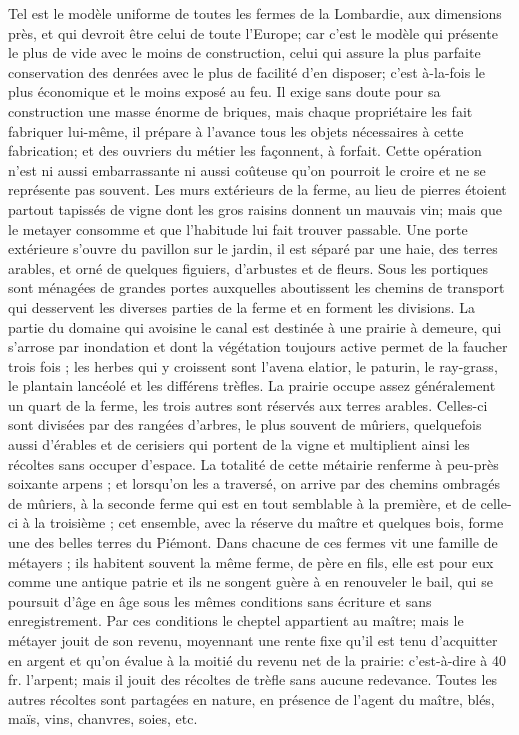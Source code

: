 \setcounter{page}{398}Tel est le modèle uniforme de toutes les fermes de la Lombardie, aux dimensions près, et qui devroit être celui de toute l'Europe; car c'est le modèle qui présente le plus de vide avec le moins de construction, celui qui assure la plus parfaite conservation des denrées avec le plus de facilité d'en disposer; c'est à-la-fois le plus économique et le moins exposé au feu. Il exige sans doute pour sa construction une masse énorme de briques, mais chaque propriétaire les fait fabriquer lui-même, il prépare à l'avance tous les objets nécessaires à cette fabrication; et des ouvriers du métier les façonnent, à forfait. Cette opération n'est ni aussi embarrassante ni aussi coûteuse qu'on pourroit le croire et ne se représente pas souvent.
Les murs extérieurs de la ferme, au lieu de pierres étoient partout tapissés de vigne dont les gros raisins donnent un mauvais vin; mais que le metayer consomme et que l'habitude lui fait trouver passable. Une porte extérieure s'ouvre du pavillon sur le jardin, il est séparé par une haie, des terres arables, et orné de quelques figuiers, d'arbustes et de fleurs. Sous les portiques sont ménagées de grandes portes auxquelles aboutissent les chemins de transport qui desservent les diverses parties de la ferme et en forment les divisions.
\setcounter{page}{399}La partie du domaine qui avoisine le canal est destinée à une prairie à demeure, qui s'arrose par inondation et dont la végétation toujours active permet de la faucher trois fois ; les herbes qui y croissent sont l'avena elatior, le paturin, le ray-grass, le plantain lancéolé et les différens trèfles. La prairie occupe assez généralement un quart de la ferme, les trois autres sont réservés aux terres arables. Celles-ci sont divisées par des rangées d'arbres, le plus souvent de mûriers, quelquefois aussi d'érables et de cerisiers qui portent de la vigne et multiplient ainsi les récoltes sans occuper d'espace.
La totalité de cette métairie renferme à peu-près soixante arpens ; et lorsqu'on les a traversé, on arrive par des chemins ombragés de mûriers, à la seconde ferme qui est en tout semblable à la première, et de celle-ci à la troisième ; cet ensemble, avec la réserve du maître et quelques bois, forme une des belles terres du Piémont.
Dans chacune de ces fermes vit une famille de métayers ; ils habitent souvent la même ferme, de père en fils, elle est pour eux comme une antique patrie et ils ne songent guère à en renouveler le bail, qui se poursuit d'âge en âge sous les mêmes conditions sans écriture et sans enregistrement.\setcounter{page}{400} Par ces conditions le cheptel appartient au maître; mais le métayer jouit de son revenu, moyennant une rente fixe qu'il est tenu d'acquitter en argent et qu'on évalue à la moitié du revenu net de la prairie: c'est-à-dire à 40 fr. l'arpent; mais il jouit des récoltes de trèfle sans aucune redevance. Toutes les autres récoltes sont partagées en nature, en présence de l'agent du maître, blés, maïs, vins, chanvres, soies, etc.

